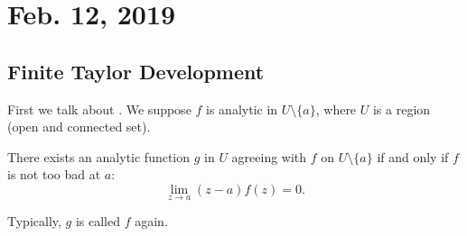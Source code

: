 \documentclass[notes]{subfile}
\begin{document}
\section{Feb. 12, 2019}

\subsection{Finite Taylor Development}

First we talk about .
We suppose $f$ is analytic in $U \setminus \{a\}$,
where $U$ is a region (open and connected set).

\begin{theorem}
    There exists an analytic function $g$ in $U$ agreeing with $f$
    on $U \setminus \{ a \}$ if and only if $f$ is not too bad
    at $a$:
    \[ \lim_{z \to a} (z-a)f(z) = 0. \]
\end{theorem}

Typically, $g$ is called $f$ again.
\end{document}
